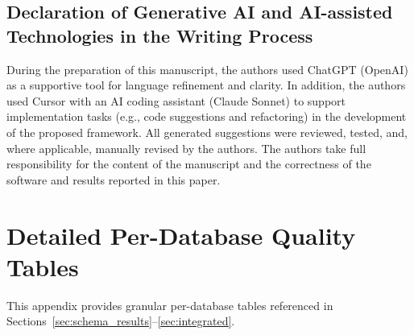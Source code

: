 \documentclass[print]{einformatica}
\begin{document}


\subsection*{Declaration of Generative AI and AI-assisted Technologies in the Writing Process}\label{sec:ai_declaration}

During the preparation of this manuscript, the authors used ChatGPT (OpenAI) as a supportive tool for language refinement and clarity. In addition, the authors used Cursor with an AI coding assistant (Claude Sonnet) to support implementation tasks (e.g., code suggestions and refactoring) in the development of the proposed framework. All generated suggestions were reviewed, tested, and, where applicable, manually revised by the authors. The authors take full responsibility for the content of the manuscript and the correctness of the software and results reported in this paper.




\appendix
\renewcommand{\thesection}{Appendix~\Alph{section}}

\section{Detailed Per-Database Quality Tables}\label{app:detailed_tables}

This appendix provides granular per-database tables referenced in Sections~\ref{sec:schema_results}--\ref{sec:integrated}.
\end{document}
